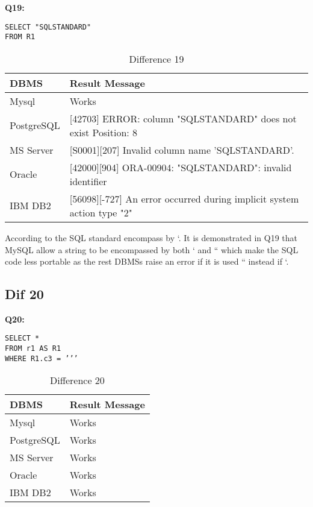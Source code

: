 \textbf{Q19:}
\begin{mdframed}[backgroundcolor=lightgray!20]
\begin{lstlisting}[style=SQL]
SELECT "SQLSTANDARD"
FROM R1
\end{lstlisting}
\end{mdframed}

 
\begin{table}[h]
\centering
\caption{Difference 19}
\label{my-label}
\begin{tabular}{|p{2cm}|p{11.5cm}| }
\hline
\textbf{DBMS} & \textbf{Result Message}                                                        \\ \hline
Mysql         & Works                                                                          \\ \hline
PostgreSQL    & {[}42703{]} ERROR: column "SQLSTANDARD" does not exist Position: 8             \\ \hline
MS Server     & {[}S0001{]}{[}207{]} Invalid column name 'SQLSTANDARD'.                        \\ \hline
Oracle        & {[}42000{]}{[}904{]} ORA-00904: "SQLSTANDARD": invalid identifier              \\ \hline
IBM DB2       & {[}56098{]}{[}-727{]} An error occurred during implicit system action type "2" \\ \hline
\end{tabular}
\end{table}

\hfill\newpage
According to the SQL standard encompass by ‘. It is demonstrated in Q19 that MySQL allow a string to be encompassed by both ‘ and “ which make the SQL code less portable as the rest DBMSs raise an error if it is used “ instead if ‘. 


\subsection{Dif 20}

\textbf{Q20:}
\begin{mdframed}[backgroundcolor=lightgray!20]
\begin{lstlisting}[style=SQL]
SELECT *
FROM r1 AS R1
WHERE R1.c3 = ’’’
\end{lstlisting}
\end{mdframed}
 
\begin{table}[h]
\centering
\caption{Difference 20}
\label{my-label}
\begin{tabular}{|p{2cm}|p{11.5cm}| }
\hline
\textbf{DBMS} & \textbf{Result Message} \\ \hline
Mysql         & Works                   \\ \hline
PostgreSQL    & Works                   \\ \hline
MS Server     & Works                   \\ \hline
Oracle        & Works                   \\ \hline
IBM DB2       & Works                   \\ \hline
\end{tabular}
\end{table}


